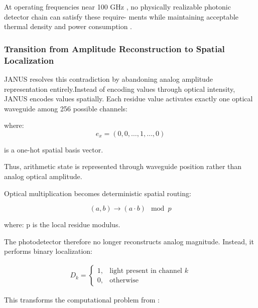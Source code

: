 \documentclass[journal]{IEEEtran}
\begin{document}
At operating frequencies near 100 GHz , no physically realizable photonic detector chain can satisfy these require-
ments while maintaining acceptable thermal density and power consumption \cite{Steckler2024}\cite{Chen2025}\cite{Liu2021}.

\subsubsection{\textbf{Transition from Amplitude Reconstruction to Spatial Localization}}
 
JANUS resolves this contradiction by abandoning analog amplitude representation entirely.Instead of encoding values through optical intensity, JANUS encodes values spatially. Each residue value activates exactly one optical waveguide among 256 possible channels:

\begin{center}
\label{eq:onehot_mapping}
\end{center}

where:
\begin{equation}
e_x = (0, 0, \dots, 1, \dots, 0)
\end{equation}

is a one-hot spatial basis vector.

Thus, arithmetic state is represented through waveguide position rather than analog optical amplitude.

Optical multiplication becomes deterministic spatial routing:

\begin{equation}
(a, b) \rightarrow (a \cdot b) \mod p
\label{eq:rns_multiplication}
\end{equation}

where: p is the local residue modulus.

The photodetector therefore no longer reconstructs analog magnitude. Instead, it performs binary localization:

\begin{align}
D_k
=
\begin{cases}
1,
&
\text{light present in channel } k
\\
0,
&
\text{otherwise}
\end{cases}
\label{eq:binary_detection}
\end{align}

This transforms the computational problem from :
\end{document}
